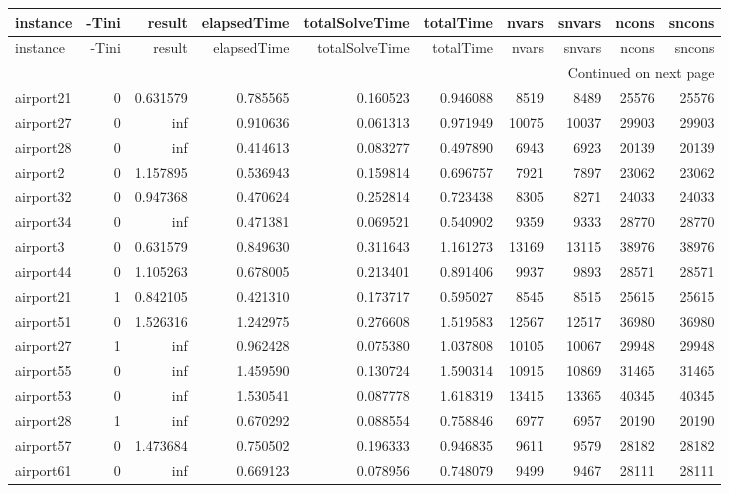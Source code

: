 
\begin{longtable}{|l|r|r|r|r|r|r|r|r|r|}
\toprule
instance & -Tini & result & elapsedTime & totalSolveTime & totalTime & nvars & snvars & ncons & sncons \\
\midrule
\endfirsthead
\toprule
instance & -Tini & result & elapsedTime & totalSolveTime & totalTime & nvars & snvars & ncons & sncons \\
\midrule
\endhead
\midrule
\multicolumn{10}{r}{Continued on next page} \\
\midrule
\endfoot
\bottomrule
\endlastfoot
airport21 & 0 & 0.631579 & 0.785565 & 0.160523 & 0.946088 & 8519 & 8489 & 25576 & 25576 \\
airport27 & 0 & inf & 0.910636 & 0.061313 & 0.971949 & 10075 & 10037 & 29903 & 29903 \\
airport28 & 0 & inf & 0.414613 & 0.083277 & 0.497890 & 6943 & 6923 & 20139 & 20139 \\
airport2 & 0 & 1.157895 & 0.536943 & 0.159814 & 0.696757 & 7921 & 7897 & 23062 & 23062 \\
airport32 & 0 & 0.947368 & 0.470624 & 0.252814 & 0.723438 & 8305 & 8271 & 24033 & 24033 \\
airport34 & 0 & inf & 0.471381 & 0.069521 & 0.540902 & 9359 & 9333 & 28770 & 28770 \\
airport3 & 0 & 0.631579 & 0.849630 & 0.311643 & 1.161273 & 13169 & 13115 & 38976 & 38976 \\
airport44 & 0 & 1.105263 & 0.678005 & 0.213401 & 0.891406 & 9937 & 9893 & 28571 & 28571 \\
airport21 & 1 & 0.842105 & 0.421310 & 0.173717 & 0.595027 & 8545 & 8515 & 25615 & 25615 \\
airport51 & 0 & 1.526316 & 1.242975 & 0.276608 & 1.519583 & 12567 & 12517 & 36980 & 36980 \\
airport27 & 1 & inf & 0.962428 & 0.075380 & 1.037808 & 10105 & 10067 & 29948 & 29948 \\
airport55 & 0 & inf & 1.459590 & 0.130724 & 1.590314 & 10915 & 10869 & 31465 & 31465 \\
airport53 & 0 & inf & 1.530541 & 0.087778 & 1.618319 & 13415 & 13365 & 40345 & 40345 \\
airport28 & 1 & inf & 0.670292 & 0.088554 & 0.758846 & 6977 & 6957 & 20190 & 20190 \\
airport57 & 0 & 1.473684 & 0.750502 & 0.196333 & 0.946835 & 9611 & 9579 & 28182 & 28182 \\
airport61 & 0 & inf & 0.669123 & 0.078956 & 0.748079 & 9499 & 9467 & 28111 & 28111 \\

\end{longtable}
